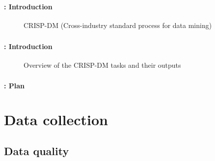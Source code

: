 \documentclass[xcolor=table]{beamer}
\subtitle[Data \& eval]{Data preparation and models' evaluation}
\begin{document}
	
\begin{frame}
	\frametitle{\inserttitle}
	\framesubtitle{\insertshortsubtitle: Introduction}
	
	\begin{figure}
		\centering
		\caption{CRISP-DM (Cross-industry standard process for data mining)}
	\end{figure}
	
\end{frame}

\begin{frame}
	\frametitle{\inserttitle}
	\framesubtitle{\insertshortsubtitle: Introduction}
	
	\begin{figure}
		\centering
		\caption{Overview of the CRISP-DM tasks and their outputs \cite{2000-wirth-hipp}}
	\end{figure}
	
\end{frame}


\begin{frame}
	\frametitle{\inserttitle}
	\framesubtitle{\insertshortsubtitle: Plan}
	
	\begin{multicols}{2}
		\tableofcontents
	\end{multicols}
\end{frame}

\section{Data collection}

\begin{frame}
	\frametitle{\insertshortsubtitle}
	\framesubtitle{\insertsection}
	
	
\end{frame}

\subsection{Data quality}
\end{document}
